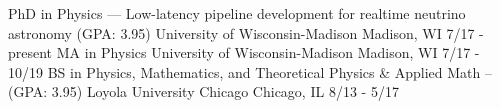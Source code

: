 
\vspace{-0.01cm}

\begin{cventries}
  \cventry
    {PhD in Physics --- Low-latency pipeline development for realtime neutrino astronomy (GPA: 3.95)} %
    {University of Wisconsin-Madison} %
    {Madison, WI}  %
    {7/17 - present} %
    {}
\vspace{-0.6cm}
   \cventry
    {MA in Physics %
    } %
    {University of Wisconsin-Madison} %
    {Madison, WI}  %
    {7/17 - 10/19} %
    {}
\vspace{-0.6cm}
  \cventry
    {BS in Physics, Mathematics, and Theoretical Physics \& Applied Math -- %
    (GPA: 3.95)} %
    {Loyola University Chicago} %
    {Chicago, IL} %
    {8/13 - 5/17 } %
    {}

\end{cventries}
